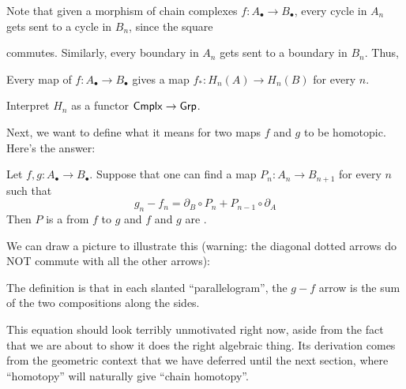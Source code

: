 Note that given a morphism of chain complexes $f \colon A_\bullet \to B_\bullet$,
every cycle in $A_n$ gets sent to a cycle in $B_n$, since the square
\begin{center}
\end{center}
commutes.
Similarly, every boundary in $A_n$ gets sent to a boundary in $B_n$. Thus,
\begin{moral}
	Every map of $f \colon A_\bullet \to B_\bullet$ gives a
	map $f_\ast \colon H_n(A) \to H_n(B)$ for every $n$.
\end{moral}
\begin{exercise}
	Interpret $H_n$ as a functor $\mathsf{Cmplx} \to \mathsf{Grp}$.
\end{exercise}

Next, we want to define what it means for two maps $f$ and $g$ to be homotopic.
Here's the answer:
\begin{definition}
	Let $f, g \colon A_\bullet \to B_\bullet$.
	Suppose that one can find a map $P_n \colon A_n \to B_{n+1}$ for every $n$ such that
	\[ g_n - f_n = \partial_B \circ P_n + P_{n-1} \circ \partial_A \]
	Then $P$ is a  from $f$ to $g$
	and $f$ and $g$ are .
\end{definition}

We can draw a picture to illustrate this (warning: the diagonal dotted arrows do NOT commute
with all the other arrows):
\begin{center}
\end{center}
The definition is that in each slanted ``parallelogram'', the $g-f$ arrow is the sum of the two
compositions along the sides.

\begin{remark}
	This equation should look terribly unmotivated right now,
	aside from the fact that we are about to show it does the right algebraic thing.
	Its derivation comes from the geometric context that we have deferred
	until the next section, where ``homotopy'' will naturally give ``chain homotopy''.
\end{remark}

